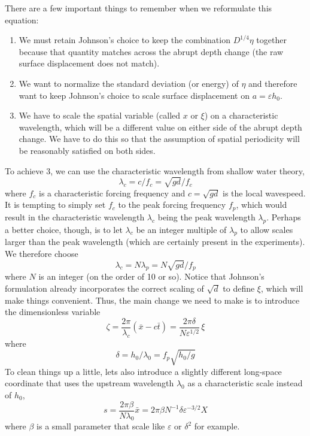 \documentclass[12pt]{article}
\newcommand{\eps}{\varepsilon}
\newcommand{\lamfac}{N}
\begin{document}
There are a few important things to remember when we reformulate this equation:
\begin{enumerate}
\item We must retain Johnson's choice to keep the combination $D^{1/4} \eta$ together because that quantity matches across the abrupt depth change (the raw surface displacement does not match).
\item We want to normalize the standard deviation (or energy) of $\eta$ and therefore want to keep Johnson's choice to scale surface displacement on $a = \eps h_0$.
\item We have to scale the spatial variable (called $x$ or $\xi$) on a characteristic wavelength, which will be a different value on either side of the abrupt depth change. We have to do this so that the assumption of spatial periodicity will be reasonably satisfied on both sides.
\end{enumerate}
To achieve 3, we can use the characteristic wavelength from shallow water theory,
\begin{equation}
\lambda_c = {c}/{f_c} = \sqrt{g d}/f_c
\end{equation}
where $f_c$ is a characteristic forcing frequency and $c = \sqrt{g d}$ is the local wavespeed. It is tempting to simply set $f_c$ to the peak forcing frequency $f_p$, which would result in the characteristic wavelength $\lambda_c$ being the peak wavelength $\lambda_p$. Perhaps a better choice, though, is to let $\lambda_c$ be an integer multiple of $\lambda_p$ to allow scales larger than the peak wavelength (which are certainly present in the experiments). We therefore choose
\begin{equation}
\lambda_c = \lamfac \lambda_p = \lamfac \sqrt{gd} / f_p
\end{equation}
where $\lamfac$ is an integer (on the order of 10 or so). Notice that Johnson's formulation already incorporates the correct scaling of $\sqrt{d}$ to define $\xi$, which will make things convenient. Thus, the main change we need to make is to introduce the dimensionless variable
\begin{equation}
\zeta = \frac{2\pi}{\lambda_c} (\bar{x} - c \bar{t}) 
= \frac{2 \pi \delta}{\lamfac \eps^{1/2}} \, \xi
\end{equation}
where
\begin{equation}
\delta = h_0 / \lambda_0 = f_p \sqrt{h_0/g}
\end{equation}
To clean things up a little, lets also introduce a slightly different long-space coordinate that uses the upstream wavelength $\lambda_0$ as a characteristic scale instead of $h_0$,
\begin{equation}
s = \frac{2 \pi \beta}{\lamfac \lambda_0} \bar{x} = 2 \pi \beta \lamfac^{-1} \delta \eps^{-3/2} X
\end{equation}
where $\beta$ is a small parameter that scale like $\eps$ or $\delta^2$ for example.
\end{document}
